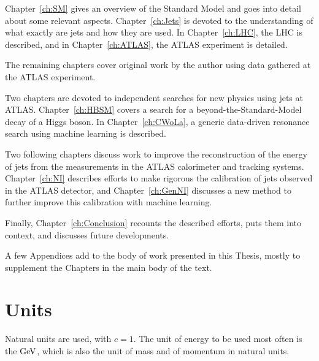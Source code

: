 Chapter~\ref{ch:SM} gives an overview of the Standard Model and goes into detail about some relevant aspects.
Chapter~\ref{ch:Jets} is devoted to the understanding of what exactly are jets and how they are used.
In Chapter~\ref{ch:LHC}, the LHC is described, and in Chapter~\ref{ch:ATLAS}, the ATLAS experiment is detailed.

The remaining chapters cover original work by the author using data gathered at the ATLAS experiment.

Two chapters are devoted to independent searches for new physics using jets at ATLAS.
Chapter~\ref{ch:HBSM} covers a search for a beyond-the-Standard-Model decay of a Higgs boson.
In Chapter~\ref{ch:CWoLa}, a generic data-driven resonance search using machine learning is described.

Two following chapters discuss work to improve the reconstruction of the energy of jets from the measurements in the ATLAS calorimeter and tracking systems.
Chapter~\ref{ch:NI} describes efforts to make rigorous the calibration of jets observed in the ATLAS detector, and Chapter~\ref{ch:GenNI} discusses a new method to further improve this calibration with machine learning.

Finally, Chapter~\ref{ch:Conclusion} recounts the described efforts, puts them into context, and discusses future developments.

A few Appendices add to the body of work presented in this Thesis, mostly to supplement the Chapters in the main body of the text.

\section{Units}
Natural units are used, with $c=1$.
The unit of energy to be used most often is the $\mathrm{GeV}$, which is also the unit of mass and of momentum in natural units.

